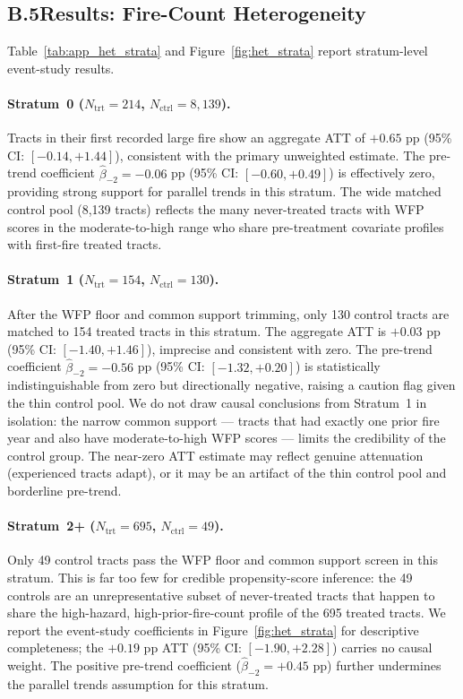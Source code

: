 \documentclass[12pt]{article}
\begin{document}
\subsection*{B.5\quad Results: Fire-Count Heterogeneity}

Table~\ref{tab:app_het_strata} and Figure~\ref{fig:het_strata} report stratum-level
event-study results.

\paragraph{Stratum~0 ($N_{\text{trt}} = 214$, $N_{\text{ctrl}} = 8{,}139$).}
Tracts in their first recorded large fire show an aggregate ATT of $+0.65$ pp
(95\% CI: $[-0.14, +1.44]$), consistent with the primary unweighted estimate.
The pre-trend coefficient $\hat{\beta}_{-2} = -0.06$ pp (95\% CI: $[-0.60, +0.49]$)
is effectively zero, providing strong support for parallel trends in this stratum.
The wide matched control pool (8,139 tracts) reflects the many never-treated tracts
with WFP scores in the moderate-to-high range who share pre-treatment covariate
profiles with first-fire treated tracts.

\paragraph{Stratum~1 ($N_{\text{trt}} = 154$, $N_{\text{ctrl}} = 130$).}
After the WFP floor and common support trimming, only 130 control tracts are matched
to 154 treated tracts in this stratum.
The aggregate ATT is $+0.03$ pp (95\% CI: $[-1.40, +1.46]$), imprecise and
consistent with zero.
The pre-trend coefficient $\hat{\beta}_{-2} = -0.56$ pp (95\% CI: $[-1.32, +0.20]$)
is statistically indistinguishable from zero but directionally negative, raising a
caution flag given the thin control pool.
We do not draw causal conclusions from Stratum~1 in isolation: the narrow common
support --- tracts that had exactly one prior fire year and also have moderate-to-high
WFP scores --- limits the credibility of the control group.
The near-zero ATT estimate may reflect genuine attenuation (experienced tracts adapt),
or it may be an artifact of the thin control pool and borderline pre-trend.

\paragraph{Stratum~2+ ($N_{\text{trt}} = 695$, $N_{\text{ctrl}} = 49$).}
Only 49 control tracts pass the WFP floor and common support screen in this stratum.
This is far too few for credible propensity-score inference: the 49 controls are
an unrepresentative subset of never-treated tracts that happen to share the high-hazard,
high-prior-fire-count profile of the 695 treated tracts.
We report the event-study coefficients in Figure~\ref{fig:het_strata} for descriptive
completeness; the $+0.19$ pp ATT (95\% CI: $[-1.90, +2.28]$) carries no causal weight.
The positive pre-trend coefficient ($\hat{\beta}_{-2} = +0.45$ pp) further
undermines the parallel trends assumption for this stratum.
\end{document}
